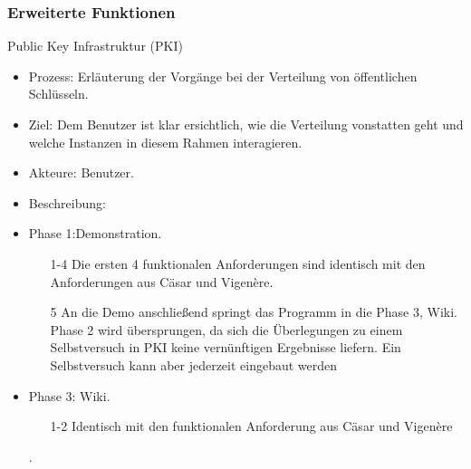 \documentclass{article}
\begin{document}
\subsubsection{Erweiterte Funktionen}

\begin{FA}[start=500]
\item Public Key Infrastruktur (PKI)
\end{FA}
\begin{itemize}[label={}]
\item Prozess: Erläuterung der Vorgänge bei der Verteilung von öffentlichen Schlüsseln.
\item Ziel: Dem Benutzer ist klar ersichtlich, wie die Verteilung vonstatten geht und welche Instanzen in diesem Rahmen 
            interagieren.
\item Akteure: Benutzer.
\item Beschreibung:
\item Phase 1:Demonstration.
\begin{enumerate}
 \item[1-4] Die ersten 4 funktionalen Anforderungen sind identisch mit den Anforderungen aus Cäsar und Vigenère. 
 \item[5] An die Demo anschließend springt das Programm in die Phase 3, Wiki. Phase 2 wird übersprungen, 
          da sich die Überlegungen zu einem Selbstversuch in PKI keine vernünftigen Ergebnisse liefern. 
          Ein Selbstversuch kann aber jederzeit eingebaut werden
\end{enumerate}
\item Phase 3: Wiki.
\begin{enumerate}
 \item[1-2] Identisch mit den funktionalen Anforderung aus Cäsar und Vigenère
\end{enumerate}.
\end{itemize}
\end{document}
